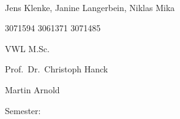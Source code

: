 \documentclass[12pt,a4paper]{article}
\begin{document}
\begin{titlepage}
\begin{center}
  \vspace{0.75cm}
  \large{}\\
  \vspace{0.5cm}
  Jens Klenke, Janine Langerbein, Niklas Mika\\
  \end{center}
  \vspace{4cm}

  \noindent\begin{minipage}[t]{0.5\textwidth}
  \end{minipage}
  \begin{minipage}[t]{0.7\textwidth}
  \hspace{1cm}3071594 \textbar{} 3061371 \textbar{} 3071485
  \end{minipage}

  \noindent\begin{minipage}[t]{0.5\textwidth}
  \end{minipage}
  \begin{minipage}[t]{0.7\textwidth}
  \hspace{1cm}VWL M.Sc.
  \end{minipage}

  \noindent\begin{minipage}[t]{0.5\textwidth}
  \end{minipage}
  \begin{minipage}[t]{0.7\textwidth}
  \hspace{1cm}Prof.~Dr.~Christoph Hanck
  \end{minipage}

  \noindent\begin{minipage}[t]{0.5\textwidth}
  \end{minipage}
  \begin{minipage}[t]{0.7\textwidth}
  \hspace{1cm}Martin Arnold
  \end{minipage}

  \noindent\begin{minipage}[t]{0.5\textwidth}
  Semester:
  \end{minipage}
  \begin{minipage}[t]{0.7\textwidth}
  \hspace{1cm}
  \end{minipage}


\end{titlepage}
\end{document}
